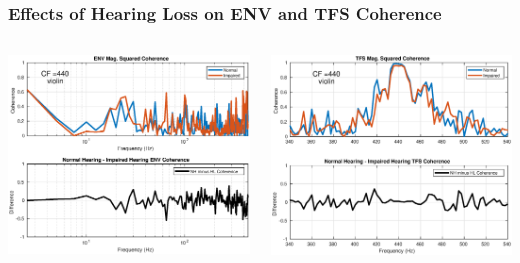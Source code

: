 \documentclass[aspectratio=1610]{beamer}
\begin{document}
\begin{frame}
\frametitle{Effects of Hearing Loss on ENV and TFS Coherence} 

\begin{columns}
\begin{column}{0.55\textwidth}
\includegraphics[scale = .4]{violin_ENV_COH_440}
\end{column}
\begin{column}{0.56\textwidth}
\includegraphics[scale = .4]{violin_TFS_COH_440}
\end{column}
\end{columns}

\end{frame}
\end{document}
